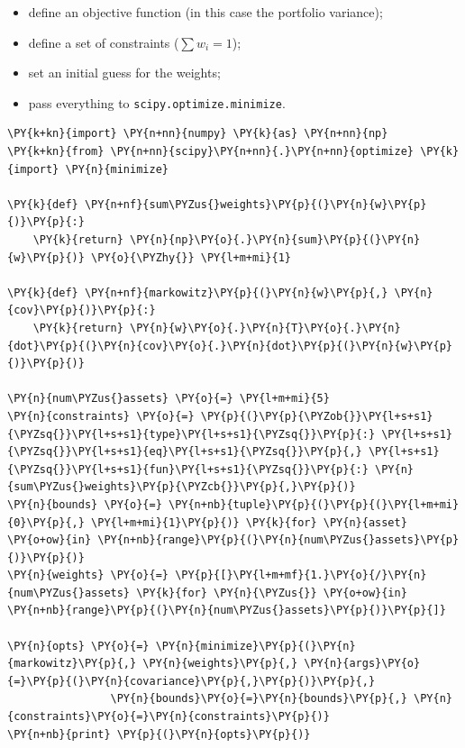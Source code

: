 \begin{itemize}
\tightlist
\item
  define an objective function (in this case the portfolio variance);
\item
  define a set of constraints ($\sum w_i = 1$);
\item
  set an initial guess for the weights;
\item
  pass everything to \texttt{scipy.optimize.minimize}.
\end{itemize}

\begin{codebox}
\begin{Verbatim}[commandchars=\\\{\}]
\PY{k+kn}{import} \PY{n+nn}{numpy} \PY{k}{as} \PY{n+nn}{np}
\PY{k+kn}{from} \PY{n+nn}{scipy}\PY{n+nn}{.}\PY{n+nn}{optimize} \PY{k}{import} \PY{n}{minimize}
		
\PY{k}{def} \PY{n+nf}{sum\PYZus{}weights}\PY{p}{(}\PY{n}{w}\PY{p}{)}\PY{p}{:} 
    \PY{k}{return} \PY{n}{np}\PY{o}{.}\PY{n}{sum}\PY{p}{(}\PY{n}{w}\PY{p}{)} \PY{o}{\PYZhy{}} \PY{l+m+mi}{1}
		
\PY{k}{def} \PY{n+nf}{markowitz}\PY{p}{(}\PY{n}{w}\PY{p}{,} \PY{n}{cov}\PY{p}{)}\PY{p}{:}
    \PY{k}{return} \PY{n}{w}\PY{o}{.}\PY{n}{T}\PY{o}{.}\PY{n}{dot}\PY{p}{(}\PY{n}{cov}\PY{o}{.}\PY{n}{dot}\PY{p}{(}\PY{n}{w}\PY{p}{)}\PY{p}{)}
		
\PY{n}{num\PYZus{}assets} \PY{o}{=} \PY{l+m+mi}{5}
\PY{n}{constraints} \PY{o}{=} \PY{p}{(}\PY{p}{\PYZob{}}\PY{l+s+s1}{\PYZsq{}}\PY{l+s+s1}{type}\PY{l+s+s1}{\PYZsq{}}\PY{p}{:} \PY{l+s+s1}{\PYZsq{}}\PY{l+s+s1}{eq}\PY{l+s+s1}{\PYZsq{}}\PY{p}{,} \PY{l+s+s1}{\PYZsq{}}\PY{l+s+s1}{fun}\PY{l+s+s1}{\PYZsq{}}\PY{p}{:} \PY{n}{sum\PYZus{}weights}\PY{p}{\PYZcb{}}\PY{p}{,}\PY{p}{)} 
\PY{n}{bounds} \PY{o}{=} \PY{n+nb}{tuple}\PY{p}{(}\PY{p}{(}\PY{l+m+mi}{0}\PY{p}{,} \PY{l+m+mi}{1}\PY{p}{)} \PY{k}{for} \PY{n}{asset} \PY{o+ow}{in} \PY{n+nb}{range}\PY{p}{(}\PY{n}{num\PYZus{}assets}\PY{p}{)}\PY{p}{)}
\PY{n}{weights} \PY{o}{=} \PY{p}{[}\PY{l+m+mf}{1.}\PY{o}{/}\PY{n}{num\PYZus{}assets} \PY{k}{for} \PY{n}{\PYZus{}} \PY{o+ow}{in} \PY{n+nb}{range}\PY{p}{(}\PY{n}{num\PYZus{}assets}\PY{p}{)}\PY{p}{]}
		
\PY{n}{opts} \PY{o}{=} \PY{n}{minimize}\PY{p}{(}\PY{n}{markowitz}\PY{p}{,} \PY{n}{weights}\PY{p}{,} \PY{n}{args}\PY{o}{=}\PY{p}{(}\PY{n}{covariance}\PY{p}{,}\PY{p}{)}\PY{p}{,}
                \PY{n}{bounds}\PY{o}{=}\PY{n}{bounds}\PY{p}{,} \PY{n}{constraints}\PY{o}{=}\PY{n}{constraints}\PY{p}{)}
\PY{n+nb}{print} \PY{p}{(}\PY{n}{opts}\PY{p}{)}


\end{Verbatim}
\end{codebox}
